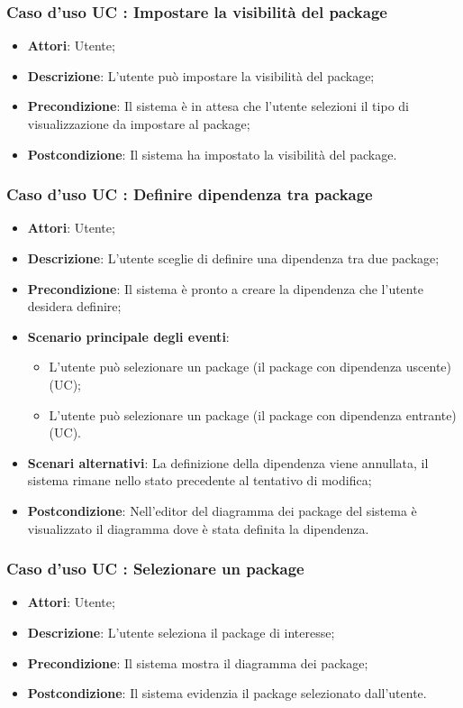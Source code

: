 \documentclass[../AnalisiDeiRequisiti.tex]{subfiles}
\begin{document}
		\subsubsection{Caso d'uso UC : Impostare la visibilità del package}
			\begin{itemize}
				\item \textbf{Attori}: Utente;
				\item \textbf{Descrizione}: L'utente può impostare la visibilità
				del package;
				\item \textbf{Precondizione}: Il sistema è in attesa che l'utente selezioni il
				tipo di visualizzazione da impostare al package;
				\item \textbf{Postcondizione}: Il sistema ha impostato la visibilità
				del package.
			\end{itemize}
		\subsubsection{Caso d'uso UC : Definire dipendenza tra package}
			\begin{itemize}
				\item \textbf{Attori}: Utente;
				\item \textbf{Descrizione}: L'utente sceglie di definire una dipendenza tra
				due package;
				\item \textbf{Precondizione}: Il sistema è pronto a creare la dipendenza che
				l'utente desidera definire;
				\item \textbf{Scenario principale degli eventi}:
					\begin{itemize}
						\item L'utente può selezionare un package (il package con dipendenza
						uscente) (UC);
						\item L'utente può selezionare un package (il package con dipendenza
						entrante) (UC).
					\end{itemize}
				\item \textbf{Scenari alternativi}: La definizione della dipendenza viene
				annullata, il sistema rimane nello stato precedente al tentativo di modifica;
				\item \textbf{Postcondizione}: Nell'editor del diagramma dei package del
				sistema è visualizzato il diagramma dove è stata definita la dipendenza.
			\end{itemize}
		\subsubsection{Caso d'uso UC : Selezionare un package}
			\begin{itemize}
				\item \textbf{Attori}: Utente;
				\item \textbf{Descrizione}: L'utente seleziona il package di interesse;
				\item \textbf{Precondizione}: Il sistema mostra il diagramma dei package;
				\item \textbf{Postcondizione}: Il sistema evidenzia il package selezionato
				dall'utente.
			\end{itemize}
\end{document}
